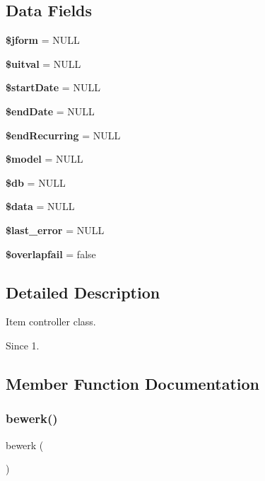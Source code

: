 \subsection*{Data Fields}
\begin{DoxyCompactItemize}
\item 
\textbf{ \$jform} = N\+U\+LL
\item 
\textbf{ \$uitval} = N\+U\+LL
\item 
\textbf{ \$start\+Date} = N\+U\+LL
\item 
\textbf{ \$end\+Date} = N\+U\+LL
\item 
\textbf{ \$end\+Recurring} = N\+U\+LL
\item 
\textbf{ \$model} = N\+U\+LL
\item 
\textbf{ \$db} = N\+U\+LL
\item 
\textbf{ \$data} = N\+U\+LL
\item 
\textbf{ \$last\+\_\+error} = N\+U\+LL
\item 
\textbf{ \$overlapfail} = false
\end{DoxyCompactItemize}


\subsection{Detailed Description}
Item controller class.

\begin{DoxySince}{Since}
1. 
\end{DoxySince}


\subsection{Member Function Documentation}
\mbox{\label{classtks__agenda_controller_item_form_acc46206cb29eafebd89e0716acc54916}} 
\subsubsection{bewerk()}
{\footnotesize\ttfamily bewerk (\begin{DoxyParamCaption}{ }\end{DoxyParamCaption})}

\mbox{\label{classtks__agenda_controller_item_form_a321844ee5340dbae104c397b285b5e7d}} 
